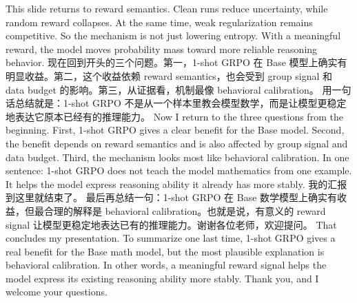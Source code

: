 {}\markdownRendererInterblockSeparator
{}This slide returns to reward semantics. Clean runs reduce uncertainty, while random reward collapses.\markdownRendererInterblockSeparator
{}At the same time, weak regularization remains competitive. So the mechanism is not just lowering entropy. With a meaningful reward, the model moves probability mass toward more reliable reasoning behavior.\markdownRendererInterblockSeparator
{}\markdownRendererHorizontalRule{}\markdownRendererInterblockSeparator
{}\markdownRendererInterblockSeparator
{}\markdownRendererInterblockSeparator
{}现在回到开头的三个问题。第一，1-shot GRPO 在 Base 模型上确实有明显收益。第二，这个收益依赖 reward semantics，也会受到 group signal 和 data budget 的影响。第三，从证据看，机制最像 behavioral calibration。\markdownRendererInterblockSeparator
{}用一句话总结就是：1-shot GRPO 不是从一个样本里教会模型数学，而是让模型更稳定地表达它原本已经有的推理能力。\markdownRendererInterblockSeparator
{}\markdownRendererInterblockSeparator
{}Now I return to the three questions from the beginning. First, 1-shot GRPO gives a clear benefit for the Base model. Second, the benefit depends on reward semantics and is also affected by group signal and data budget. Third, the mechanism looks most like behavioral calibration.\markdownRendererInterblockSeparator
{}In one sentence: 1-shot GRPO does not teach the model mathematics from one example. It helps the model express reasoning ability it already has more stably.\markdownRendererInterblockSeparator
{}\markdownRendererHorizontalRule{}\markdownRendererInterblockSeparator
{}\markdownRendererInterblockSeparator
{}\markdownRendererInterblockSeparator
{}我的汇报到这里就结束了。\markdownRendererInterblockSeparator
{}最后再总结一句：1-shot GRPO 在 Base 数学模型上确实有收益，但最合理的解释是 behavioral calibration。也就是说，有意义的 reward signal 让模型更稳定地表达已有的推理能力。谢谢各位老师，欢迎提问。\markdownRendererInterblockSeparator
{}\markdownRendererInterblockSeparator
{}That concludes my presentation.\markdownRendererInterblockSeparator
{}To summarize one last time, 1-shot GRPO gives a real benefit for the Base math model, but the most plausible explanation is behavioral calibration. In other words, a meaningful reward signal helps the model express its existing reasoning ability more stably. Thank you, and I welcome your questions.\markdownRendererInterblockSeparator
